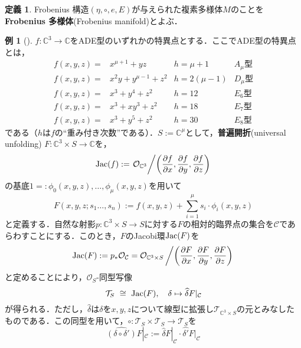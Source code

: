 \documentclass[a4paper,11pt]{jbook}
\theoremstyle{plain}
\theoremstyle{definition}
\newtheorem{defn}[thm]{定義}
\newtheorem{exmp}[thm]{例}
\theoremstyle{remark}
\theoremstyle{proof}
\numberwithin{equation}{section}
\def\CC{{\mathbb C}}
\def\C{{\mathcal C}}
\def\O{{\mathcal O}}
\def\T{{\mathcal T}}
\def\p{{\partial }}
\def\p{\partial }
\begin{document}
\begin{defn}
Frobenius 構造$(\eta, \circ , e,E)$が与えられた複素多様体$M$のことを{\bf Frobenius 多様体}(Frobenius manifold)とよぶ．
\end{defn}
\begin{exmp}[\cite{st:1}]
\label{exmp : universal unfolding}
$f:\CC^{3}\to\CC$をADE型のいずれかの特異点とする．ここでADE型の特異点とは，
\[
\begin{array}{cllc}
 f(x,y,z)=& x^{\mu+1}+yz & h=\mu+1 & \text{$A_{\mu}$型} \\
 f(x,y,z)=& x^{2}y+y^{\mu-1}+z^{2} & h=2(\mu-1) & \text{$D_{\mu}$型} \\
 f(x,y,z)=& x^{3}+y^{4}+z^{2} &h=12& \text{$E_{6}$型} \\
 f(x,y,z)=& x^{3}+xy^{3}+z^{2} &h=18&  \text{$E_{7}$型} \\
 f(x,y,z)=& x^{3}+y^{5}+z^{2} &h=30& \text{$E_{8}$型}
\end{array}
\]
である（$h$は$f$の``重み付き次数''である）．$S:=\CC^{\mu}$として，{\bf 普遍開折}(universal unfolding) $F:\CC^{3}\times S\to\CC$を，
\begin{equation}
{\rm Jac}(f):=\left. \O_{\CC^{3}} \middle/ \left( \dfrac{\p f}{\p x} , \dfrac{\p f}{\p y} , \dfrac{\p f}{\p z} \right) \right.
\end{equation}
の基底$1=:\phi_{0}(x,y,z),\dots,\phi_{\mu}(x,y,z)$を用いて
\begin{equation}
F(x,y,z;s_{1}\dots,s_{n}):=f(x,y,z)+\sum_{i=1}^{\mu}s_{i}\cdot\phi_{i}(x,y,z)
\end{equation}
と定義する．自然な射影$p:\CC^{3}\times S\to S$に対する$F$の相対的臨界点の集合を$\C$であらわすことにする．このとき，$F$のJacobi環${\rm Jac}(F)$を
\begin{equation}
{\rm Jac}(F):=p_{*}\O_{\C}=\O_{\CC^{3}\times S} \left/ \left( \dfrac{\p F}{\p x} , \dfrac{\p F}{\p y} , \dfrac{\p F}{\p z} \right) \right.
\end{equation}
と定めることにより，$\O_{S}$-同型写像
\begin{equation}
\T_{S} ~\cong~ {\rm Jac}(F),\quad \delta \mapsto \widehat{\delta}F|_{\C}
\end{equation}
が得られる．ただし，$\widehat{\delta}$は$\delta$を$x,y,z$について線型に拡張し$\T_{\CC^{3}\times S}$の元とみなしたものである．この同型を用いて，$\circ:\T_{S}\times\T_{S}\to\T_{S}$を
\begin{equation}
\widehat{(\delta\circ\delta')}F|_{\C}:=\widehat{\delta}F|_{\C}\cdot \widehat{\delta'}F|_{\C}
\end{equation}

\end{exmp}
\end{document}
